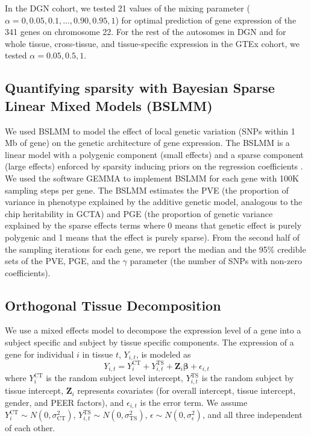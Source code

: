 \documentclass[10pt,letterpaper]{article}
\begin{document}
In the DGN cohort, we tested 21 values of the mixing parameter
(\(\alpha=0, 0.05, 0.1, ..., 0.90, 0.95, 1\)) for optimal prediction of
gene expression of the 341 genes on chromosome 22. For the rest of the
autosomes in DGN and for whole tissue, cross-tissue, and tissue-specific
expression in the GTEx cohort, we tested \(\alpha=0.05, 0.5, 1\).

\subsection*{Quantifying sparsity with Bayesian Sparse Linear Mixed
Models
(BSLMM)}\label{quantifying-sparsity-with-bayesian-sparse-linear-mixed-models-bslmm}

We used BSLMM \cite{Zhou_2013} to model the effect of local genetic variation
(SNPs within 1 Mb of gene) on the genetic architecture of gene
expression. The BSLMM is a linear model with a polygenic component (small effects) and a sparse component (large effects)
enforced by sparsity inducing priors on the
regression coefficients \cite{Zhou_2013}. We used the software GEMMA \cite{Zhou_2012} to
implement BSLMM for each gene %
with 100K sampling steps per gene.
 The BSLMM estimates the PVE (the proportion of variance in
phenotype explained by the additive genetic model, analogous to the chip heritability in GCTA) and PGE (the proportion of genetic variance explained by the sparse effects terms where 0 means that genetic effect is purely polygenic and 1 means that the effect is purely sparse). From the second half of the sampling iterations for each gene, we report the median and the 95\% credible sets of the
PVE, PGE, and the \textbar{}\(\gamma\)\textbar{} parameter (the number of SNPs with non-zero coefficients).

\subsection*{Orthogonal Tissue Decomposition}\label{orthogonal-tissue-decomposition}

We use a mixed effects model to decompose the expression level of a gene into a subject specific and subject by tissue specific components. The expression of a gene for individual $i$ in tissue $t$, $Y_{i,t}$, is modeled as
%
\[Y_{i,t} =  Y_{i}^{\text{CT}}   + Y_{i,t}^{\text{TS}} + \mathbf{Z}_i \boldsymbol{\beta} + \epsilon_{i,t}  \] 
%
where $Y_{i}^{\text{CT}}$ is the random subject level intercept,  $Y_{i,t}^{\text{TS}} $ is the random subject by tissue intercept, $\mathbf{Z}_i $ represents covariates (for overall intercept, tissue intercept, gender, and PEER factors), and $\epsilon_{i,t}$ is the error term. We assume $Y_{i}^{\text{CT}} \sim N(0,\sigma_{\text{CT}}^2)$, $Y_{i,t}^{\text{TS}} \sim N(0,\sigma_{\text{TS}}^2)$, $\epsilon \sim N(0,\sigma^2_{\epsilon})$, and all three independent of each other.
\end{document}
